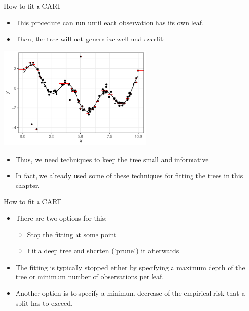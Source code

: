 \documentclass[11pt,compress,t,notes=noshow, xcolor=table]{beamer}
\begin{document}
\begin{vbframe}{How to fit a CART}
\begin{itemize}
\item This procedure can run until each observation has its own leaf.
\item Then, the tree will not generalize well and overfit:
\end{itemize}

{\centering \includegraphics[width=0.58\textwidth]{figure/tree-overfitting-prediction.pdf} 

}

\begin{itemize}
\item Thus, we need techniques to keep the tree small and informative
\item In fact, we already used some of these techniques for fitting the trees in this chapter.
\end{itemize}

\end{vbframe}
\begin{vbframe}{How to fit a CART}
\begin{itemize}
\item There are two options for this:
\begin{itemize}
\item Stop the fitting at some point
\item Fit a deep tree and shorten ("prune") it afterwards
\end{itemize}
\item The fitting is typically stopped either by specifying a maximum depth of the tree or minimum number of observations per leaf.
\item Another option is to specify a minimum decrease of the empirical risk that a split has to exceed.
\end{itemize}



\end{vbframe} 
\end{document}
